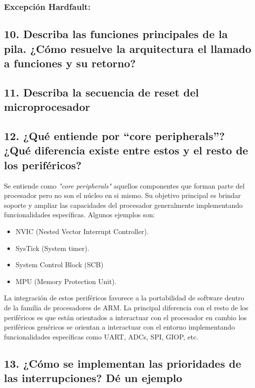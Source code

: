 \documentclass[10pt,a4paper,twoside,spanish]{article}	%
\begin{document}
\subsubsection*{Excepción Hardfault:}


\subsection*{10. Describa las funciones principales de la pila. ¿Cómo resuelve la arquitectura el llamado a funciones y su retorno?}

\subsection*{11. Describa la secuencia de reset del microprocesador}

\subsection*{12. ¿Qué entiende por “core peripherals”? ¿Qué diferencia existe entre estos y el resto de los periféricos?}

Se entiende como \textit{"core peripherals"} aquellos componentes que forman parte del procesador pero no son el núcleo en si mismo. Su objetivo principal es brindar soporte y ampliar las capacidades del procesador generalmente implementando funcionalidades específicas. Algunos ejemplos son:
\begin{itemize}

\item NVIC (Nested Vector Interrupt Controller).
\item SysTick (System timer).
\item System Control Block (SCB)
\item MPU (Memory Protection Unit).
\end{itemize}

La integración de estos periféricos favorece a la portabilidad de software dentro de la familia de procesadores de ARM. La principal diferencia con el resto de los periféricos es que están orientados a interactuar con el procesador en cambio los periféricos genéricos se orientan a interactuar con el entorno implementando funcionalidades específicas como UART, ADCs, SPI, GIOP, etc.



\subsection*{13. ¿Cómo se implementan las prioridades de las interrupciones? Dé un ejemplo}
\end{document}
